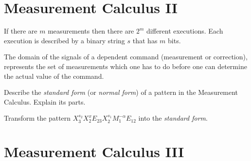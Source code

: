 \section{Measurement Calculus II}

If there are $m$ measurements then there are $2^m$ different 
executions. Each execution is described by a binary string $s$ that has $m$ bits. 


The domain of the signals of a dependent command (measurement or correction), represents
the set of measurements which one has to do before one can determine
the actual value of the command.


\begin{example}
Describe the \textit{standard form} (or \textit{normal form}) 
of a pattern in the Measurement Calculus. Explain its parts. 
\end{example}

\frmrule

\begin{example}
Transform the pattern $X^{s_2}_3 X^{x}_2 E_{23} X^{s_1}_2 M^{-\alpha}_1 E_{12}$ into the \textit{standard form}. 
\end{example}


\section{Measurement Calculus III}

